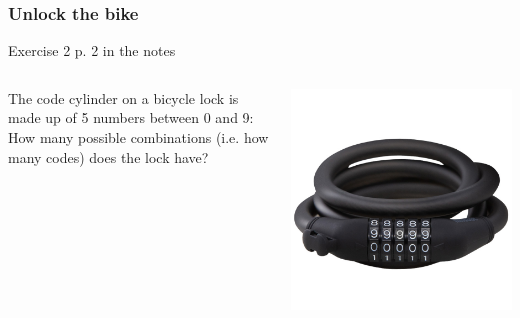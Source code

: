 \documentclass[10pt]{beamer}
\begin{document}
\begin{frame}
  \frametitle{Unlock the bike}
  
  \begin{block}{Exercise 2 p. 2 in the notes}
    \begin{columns}
      \begin{column}{0.6\linewidth}
        The code cylinder on a bicycle lock is made up of 5 numbers between 0 and 9: How many possible combinations (i.e. how many codes) does the lock have?
      \end{column}
      \begin{column}{0.3\linewidth}

       \includegraphics[width=\linewidth]{img/lock5.jpg} 

      \end{column}
    \end{columns}
  \end{block}
\end{frame}
\end{document}
